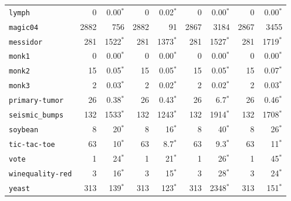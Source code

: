 \begin{tabular}{lrrrrrrrr}
\texttt{lymph} & 0 & 0.00$^*$ & 0 & 0.02$^*$ & 0 & 0.00$^*$ & 0 & 0.00$^*$\\
\texttt{magic04} & 2882 & 756 & 2882 & 91 & 2867 & 3184 & 2867 & 3455\\
\texttt{messidor} & 281 & 1522$^*$ & 281 & 1373$^*$ & 281 & 1527$^*$ & 281 & 1719$^*$\\
\texttt{monk1} & 0 & 0.00$^*$ & 0 & 0.00$^*$ & 0 & 0.00$^*$ & 0 & 0.00$^*$\\
\texttt{monk2} & 15 & 0.05$^*$ & 15 & 0.05$^*$ & 15 & 0.05$^*$ & 15 & 0.07$^*$\\
\texttt{monk3} & 2 & 0.03$^*$ & 2 & 0.02$^*$ & 2 & 0.02$^*$ & 2 & 0.03$^*$\\
\texttt{primary-tumor} & 26 & 0.38$^*$ & 26 & 0.43$^*$ & 26 & 6.7$^*$ & 26 & 0.46$^*$\\
\texttt{seismic\_bumps} & 132 & 1533$^*$ & 132 & 1243$^*$ & 132 & 1914$^*$ & 132 & 1708$^*$\\
\texttt{soybean} & 8 & 20$^*$ & 8 & 16$^*$ & 8 & 40$^*$ & 8 & 26$^*$\\
\texttt{tic-tac-toe} & 63 & 10$^*$ & 63 & 8.7$^*$ & 63 & 9.3$^*$ & 63 & 11$^*$\\
\texttt{vote} & 1 & 24$^*$ & 1 & 21$^*$ & 1 & 26$^*$ & 1 & 45$^*$\\
\texttt{winequality-red} & 3 & 16$^*$ & 3 & 15$^*$ & 3 & 28$^*$ & 3 & 24$^*$\\
\texttt{yeast} & 313 & 139$^*$ & 313 & 123$^*$ & 313 & 2348$^*$ & 313 & 151$^*$\\
\bottomrule
\end{tabular}
